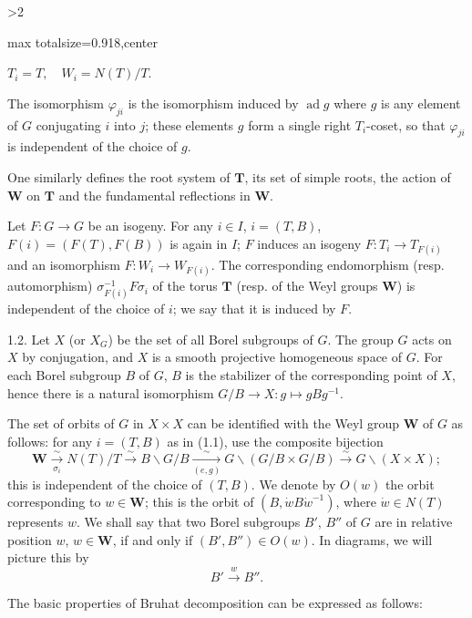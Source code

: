 \documentclass[9pt,twoside]{extarticle}
\newcommand{\EditionPage}[3]{%
  \ifnum#1>2\clearpage\fi
  \pdfbookmark[1]{Printed page #2}{en-folio-#2}%
  \hypertarget{en-physical-#1}{}%
  \noindent\begin{adjustbox}{max totalsize={\textwidth}{0.918\textheight},center}
  \begin{minipage}[t]{\textwidth}
  \fontsize{9.4}{11.1}\selectfont\justifying
  #3
  \end{minipage}
  \end{adjustbox}%
}
\begin{document}
\EditionPage{5}{106}{%
\(T_i=T,\quad W_i=N(T)/T.\)\par

The isomorphism \(\varphi_{ji}\) is the isomorphism induced by \(\operatorname{ad}g\) where \(g\) is any element of \(G\) conjugating \(i\) into \(j\); these elements \(g\) form a single right \(T_i\)-coset, so that \(\varphi_{ji}\) is independent of the choice of \(g\).\par

One similarly defines the root system of \(\mathbf{T}\), its set of simple roots, the action of \(\mathbf{W}\) on \(\mathbf{T}\) and the fundamental reflections in \(\mathbf{W}\).\par

Let \(F:G\to G\) be an isogeny. For any \(i\in I\), \(i=(T,B)\), \(F(i)=(F(T),F(B))\) is again in \(I\); \(F\) induces an isogeny \(F:T_i\to T_{F(i)}\) and an isomorphism \(F:W_i\to W_{F(i)}\). The corresponding endomorphism (resp. automorphism) \(\sigma_{F(i)}^{-1}F\sigma_i\) of the torus \(\mathbf{T}\) (resp. of the Weyl groups \(\mathbf{W}\)) is independent of the choice of \(i\); we say that it is induced by \(F\).\par

1.2. Let \(X\) (or \(X_G\)) be the set of all Borel subgroups of \(G\). The group \(G\) acts on \(X\) by conjugation, and \(X\) is a smooth projective homogeneous space of \(G\). For each Borel subgroup \(B\) of \(G\), \(B\) is the stabilizer of the corresponding point of \(X\), hence there is a natural isomorphism \(G/B\to X:g\mapsto gBg^{-1}\).\par

The set of orbits of \(G\) in \(X\times X\) can be identified with the Weyl group \(\mathbf{W}\) of \(G\) as follows: for any \(i=(T,B)\) as in (1.1), use the composite bijection \[
\mathbf{W}\xrightarrow[\sigma_i]{\sim}N(T)/T\xrightarrow{\sim}B\backslash G/B\xrightarrow[(e,g)]{\sim}G\backslash(G/B\times G/B)\xrightarrow{\sim}G\backslash(X\times X);
\] this is independent of the choice of \((T,B)\). We denote by \(O(w)\) the orbit corresponding to \(w\in\mathbf{W}\); this is the orbit of \((B,\dot{w}B\dot{w}^{-1})\), where \(\dot{w}\in N(T)\) represents \(w\). We shall say that two Borel subgroups \(B'\), \(B''\) of \(G\) are in relative position \(w\), \(w\in\mathbf{W}\), if and only if \((B',B'')\in O(w)\). In diagrams, we will picture this by \[
B'\xrightarrow{w}B''.
\]\par

The basic properties of Bruhat decomposition can be expressed as follows:\par

}
\end{document}
